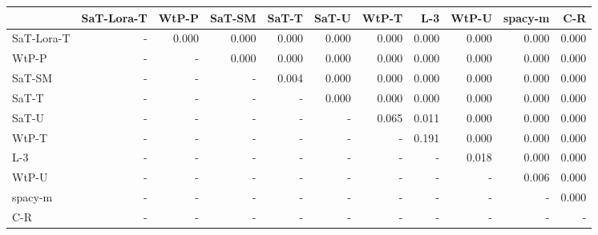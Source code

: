 \begin{tabular}{lrrrrrrrrrr}
\toprule
 & SaT-Lora-T & WtP-P & SaT-SM & SaT-T & SaT-U & WtP-T & L-3 & WtP-U & spacy-m & C-R \\
\midrule
SaT-Lora-T & - & 0.000 & 0.000 & 0.000 & 0.000 & 0.000 & 0.000 & 0.000 & 0.000 & 0.000 \\
WtP-P & - & - & 0.000 & 0.000 & 0.000 & 0.000 & 0.000 & 0.000 & 0.000 & 0.000 \\
SaT-SM & - & - & - & 0.004 & 0.000 & 0.000 & 0.000 & 0.000 & 0.000 & 0.000 \\
SaT-T & - & - & - & - & 0.000 & 0.000 & 0.000 & 0.000 & 0.000 & 0.000 \\
SaT-U & - & - & - & - & - & 0.065 & 0.011 & 0.000 & 0.000 & 0.000 \\
WtP-T & - & - & - & - & - & - & 0.191 & 0.000 & 0.000 & 0.000 \\
L-3 & - & - & - & - & - & - & - & 0.018 & 0.000 & 0.000 \\
WtP-U & - & - & - & - & - & - & - & - & 0.006 & 0.000 \\
spacy-m & - & - & - & - & - & - & - & - & - & 0.000 \\
C-R & - & - & - & - & - & - & - & - & - & - \\
\bottomrule
\end{tabular}

